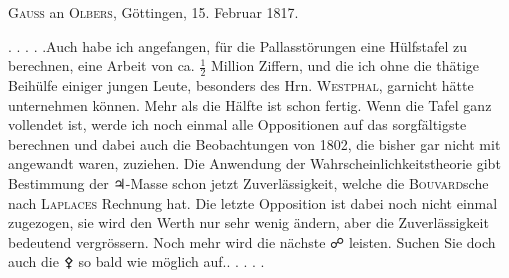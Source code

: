 \par{}\bigskip
\begin{center}
\textsc{Gauss} an \textsc{Olbers}, Göttingen, 15. Februar 1817.
\end{center}
\noindent\hspace*{\parindent}. . . . .\quad Auch habe ich angefangen, für die Pallasstörungen eine Hülfstafel zu berechnen, eine Arbeit von ca. \(\frac{1}{2}\) Million Ziffern, und die ich ohne die thätige Beihülfe einiger jungen Leute, besonders des Hrn. \textsc{Westphal}, garnicht hätte unternehmen können. Mehr als die Hälfte ist schon fertig. Wenn die Tafel ganz vollendet ist, werde ich noch einmal alle Oppositionen auf das sorgfältigste berechnen und dabei auch die Beobachtungen von 1802, die bisher gar nicht mit angewandt waren, zuziehen. Die Anwendung der Wahrscheinlichkeitstheorie gibt  Bestimmung der {\AstroSymbols ♃}-Masse schon jetzt  Zuverlässigkeit, welche die \textsc{Bouvard}sche nach \textsc{Laplaces} Rechnung hat. Die letzte Opposition ist dabei noch nicht einmal zugezogen, sie wird den Werth nur sehr wenig ändern, aber die Zuverlässigkeit bedeutend vergrössern. Noch mehr wird die nächste {\AstroSymbols ☍} leisten. Suchen Sie doch auch die {\AstroSymbols ⚴} so bald wie möglich auf.\quad . . . . .
\par
